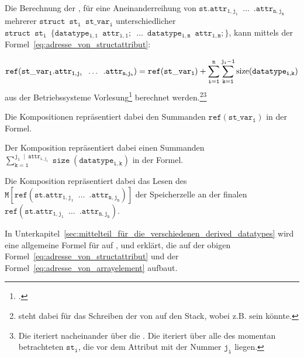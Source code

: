 \begin{Special_Paragraph}
  Die Berechnung der , für eine Aneinanderreihung von  $\mathtt{st.attr_{1, j_1}\enspace\ldots\enspace .attr_{n, j_n}}$ mehrerer  $\mathtt{struct\enspace st_i\enspace st\_var_i}$ unterschiedlicher  $\mathtt{struct\enspace st_i\enspace \{datatype_{i, 1}\enspace attr_{i, 1};\enspace\ldots\enspace datatype_{i, m}\enspace attr_{i, m};\}}$, kann mittels der Formel~\ref{eq:adresse_von_structattribut}:

  \begin{equation}
    \mathtt{ref(st\_var_1.attr_{1, j_1}\enspace\ldots\enspace .attr_{n, j_n}) = ref(st\_var_1) + \sum_{i=1}^{n}\sum_{k=1}^{j_i - 1} \operatorname{size}(datatype_{i, k})} \\
    \label{eq:adresse_von_structattribut}
  \end{equation}
  aus der Betriebssysteme Vorlesung\footcite{scholl_betriebssysteme_2020} berechnet werden.\footnote{ steht dabei für das Schreiben der  von  auf den Stack, wobei  z.B.  sein könnte.}\footnote{Die  iteriert nacheinander über die . Die  iteriert über alle  des momentan betrachteten  $\mathtt{st_i}$, die vor dem Attribut mit der Nummer $\mathtt{j_i}$ liegen.}

  Die Kompositionen  repräsentiert dabei den Summanden $\mathtt{ref(st\_var_1)}$ in der Formel.

  Der Komposition  repräsentiert dabei einen Summanden $\mathtt{\sum_{k=1}^{j_i\;\mid\; attr_{i,j_i}} \operatorname{size}(datatype_{i, k})}$ in der Formel.

Die Komposition  repräsentiert dabei das Lesen des  $\mathtt{M\left[ref(st.attr_{1, j_1}\enspace\ldots\enspace .attr_{n, j_n})\right]}$ der Speicherzelle an der finalen   $\mathtt{ref(st.attr_{1, j_1}\enspace\ldots\enspace .attr_{n, j_n})}$.

In Unterkapitel~\ref{sec:mittelteil_für_die_verschiedenen_derived_datatypes} wird eine allgemeine Formel für  auf ,  und  erklärt, die auf der obigen Formel~\ref{eq:adresse_von_structattribut} und der Formel~\ref{eq:adresse_von_arrayelement} aufbaut.
\end{Special_Paragraph}

